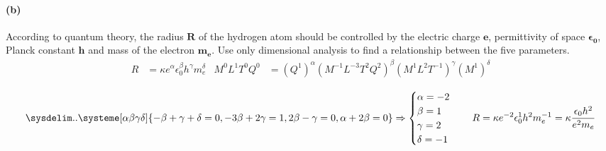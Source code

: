\documentclass[]{article}
\begin{document}
{		\paragraph*{(b)} According to quantum theory, the radius $\bm{R}$ of the hydrogen atom should be controlled by the electric charge $\bm{e}$, permittivity of
		space $\bm{\epsilon_0}$, Planck constant $\bm{h}$ and mass of the electron $\bm{m_e}$. Use only dimensional analysis to find a relationship between the five parameters.
			\begin{equation*}
				\begin{aligned}
					R &= \kappa e^{\alpha} \epsilon_0^{\beta} h^{\gamma} m_e^{\delta} & M^0 L^1 T^0 Q^0 &= (Q^1)^{\alpha} (M^{-1} L^{-3} T^2 Q^2)^{\beta} (M^1 L^2 T^{-1})^{\gamma} (M^1)^{\delta}
					\\
				\end{aligned}
			\end{equation*}
			\begin{equation*}
				\sysdelim..\systeme[\alpha\beta\gamma\delta]{
					-\beta + \gamma + \delta= 0, 
					-3\beta + 2\gamma = 1,
					2\beta - \gamma = 0,
					\alpha + 2\beta = 0
				} \Rightarrow
				\begin{cases}
					\alpha = -2 \\ 
					\beta = 1 \\
					\gamma = 2 \\
					\delta = -1
				\end{cases}
				\quad
				R = \kappa e^{-2} \epsilon_0^1 h^{2} m_e^{-1} = \kappa\frac{\epsilon_0 h^2}{e^2 m_e}
			\end{equation*}
		
}
\end{document}
